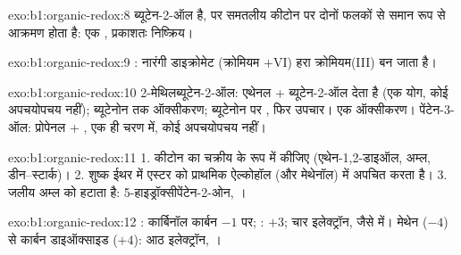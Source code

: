 \begin{solution}{exo:b1:organic-redox:8}
ब्यूटेन-2-ऑल  है, पर समतलीय कीटोन पर दोनों फलकों से समान रूप से आक्रमण
होता है: एक , प्रकाशतः निष्क्रिय।
\end{solution}

\begin{solution}{exo:b1:organic-redox:9}
: नारंगी
डाइक्रोमेट (क्रोमियम $+$VI) हरा क्रोमियम(III) बन जाता है।
\end{solution}

\begin{solution}{exo:b1:organic-redox:10}
2-मेथिलब्यूटेन-2-ऑल: एथेनल +  ब्यूटेन-2-ऑल देता है (एक
योग, कोई अपचयोपचय नहीं); ब्यूटेनोन तक ऑक्सीकरण; ब्यूटेनोन पर ,
फिर उपचार। एक ऑक्सीकरण। पेंटेन-3-ऑल: प्रोपेनल + ,
एक ही चरण में, कोई अपचयोपचय नहीं।
\end{solution}

\begin{solution}{exo:b1:organic-redox:11}
1. कीटोन का चक्रीय  के रूप में  कीजिए (एथेन-1,2-डाइऑल, अम्ल,
डीन--स्टार्क)। 2. शुष्क ईथर में  एस्टर को
प्राथमिक ऐल्कोहॉल (और मेथेनॉल) में अपचित करता है। 3. जलीय अम्ल  को हटाता है:
5-हाइड्रॉक्सीपेंटेन-2-ओन, ।
\end{solution}

\begin{solution}{exo:b1:organic-redox:12}
: कार्बिनॉल कार्बन $-1$ पर; : $+3$; चार इलेक्ट्रॉन, जैसे
 में। मेथेन ($-4$) से कार्बन डाइऑक्साइड
($+4$): आठ इलेक्ट्रॉन, ।
\end{solution}

